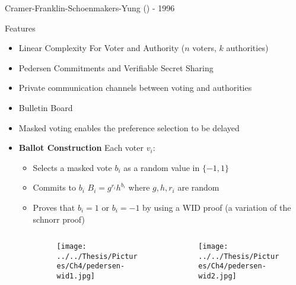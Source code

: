 \documentclass{beamer}
\begin{document}
\begin{frame}[allowframebreaks]{Cramer-Franklin-Schoenmakers-Yung (\cite{CFSY96}) - 1996}

\begin{block}{Features} 
\begin{itemize}
\item Linear Complexity For Voter and Authority ($n$ voters, $k$ authorities)
\item Pedersen Commitments and Verifiable Secret Sharing
\item Private communication channels between voting and authorities
\item Bulletin Board
\item Masked voting enables the preference selection to be delayed
\end{itemize}
\end{block}
\begin{itemize}
\item \textbf{Ballot Construction} Each voter $v_i$:
\begin{itemize}
	\item Selects a masked vote $b_i$ as a random value in $\{ -1, 1 \}$
	\item Commits to $b_i$ $B_i = g^{r_i} h^{b_i} $ where $g,h,r_i$ are random
	
	\framebreak 
	\item Proves that $b_i=1$ or $b_i=-1$ by using a WID proof	(a variation of the schnorr proof)
	
	\begin{columns}
		\begin{column}{0.5\textwidth}
		\begin{figure}[htbp]
		\texttt{[image: ../../Thesis/Pictures/Ch4/pedersen-wid1.jpg]} 
		 
		\label{fig:cpwid1}
		\end{figure}
		\end{column}

		\begin{column}{0.5\textwidth}
		\begin{figure}[htbp]
		\texttt{[image: ../../Thesis/Pictures/Ch4/pedersen-wid2.jpg]} 
		 
		\label{fig:cpwid-1}
		\end{figure}
		\end{column}
	\end{columns}
	

\end{itemize}
\end{itemize}
\end{frame}
\end{document}
